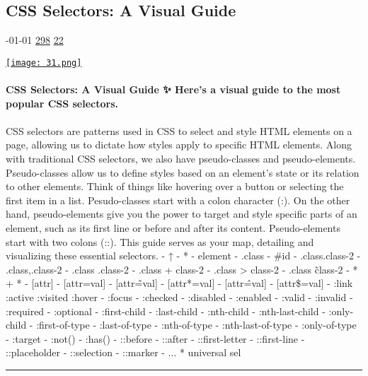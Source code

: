 \documentclass[10pt,a4paper]{article}
\begin{document}
\begin{multicols*}{2}

\noindent\begin{minipage}{\linewidth}
\subsection{CSS Selectors: A Visual Guide}
\textsc{\footnotesize
{\scriptsize\faCalendar}-01-01 
{\scriptsize\faThumbsOUp}\space 
\href{http://news.ycombinator.com/item?id=37132754\&utm\_term=comment}{298} 
{\scriptsize\faComments}\space 
\href{http://news.ycombinator.com/item?id=37132754\&utm\_term=comment}{22} 
}
\par\medskip\noindent
\href{https://fffuel.co/css-selectors/?utm\_source=hackernewsletter\&utm\_medium=email\&utm\_term=design}{
    \texttt{[image: 31.png]}
}
\end{minipage}
\paragraph{}
\textbf{CSS Selectors: A Visual Guide
✨ Here's a visual guide to the most popular CSS selectors.}
\paragraph{}

CSS selectors are patterns used in CSS to select and style HTML elements on a page, allowing us to dictate how styles apply to specific HTML elements.
Along with traditional CSS selectors, we also have pseudo-classes and pseudo-elements. Pseudo-classes allow us to define styles based on an element's state or its relation to other elements. Think of things like hovering over a button or selecting the first item in a list. Pesudo-classes start with a colon character (:).
On the other hand, pseudo-elements give you the power to target and style specific parts of an element, such as its first line or before and after its content. Pseudo-elements start with two colons (::).
This guide serves as your map, detailing and visualizing these essential selectors.
- ↑
- *
- element
- .class
- \#id
- .class.class-2
- .class,.class-2
- .class .class-2
- .class + class-2
- .class > class-2
- .class \~ class-2
- * + *
- [attr]
- [attr=val]
- [attr\~=val]
- [attr*=val]
- [attr\^=val]
- [attr\$=val]
- :link :active :visited :hover
- :focus
- :checked
- :disabled
- :enabled
- :valid
- :invalid
- :required
- :optional
- :first-child
- :last-child
- :nth-child
- :nth-last-child
- :only-child
- :first-of-type
- :last-of-type
- :nth-of-type
- :nth-last-of-type
- :only-of-type
- :target
- :not()
- :has()
- ::before
- ::after
- ::first-letter
- ::first-line
- ::placeholder
- ::selection
- ::marker
- ...
* universal sel
\par\noindent\textcolor{red}{\rule{\linewidth}{0.2mm}}
\vfill
\null
\noindent\begin{minipage}{\linewidth}

\end{minipage}
\end{multicols*}
\end{document}
